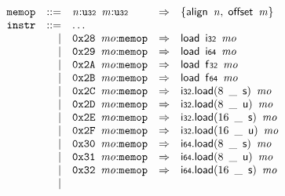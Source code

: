 $$
\begin{array}{@{}l@{}rrlll@{}l@{}}
& {\mathtt{memop}} &::=& {\mathit{n}}{:}{\mathtt{u{\scriptstyle32}}}~\,{\mathit{m}}{:}{\mathtt{u{\scriptstyle32}}} &\Rightarrow& \{ \begin{array}[t]{@{}l@{}}
\mathsf{align}~\,{\mathit{n}},\; \mathsf{offset}~\,{\mathit{m}} \}\end{array} \\
& {\mathtt{instr}} &::=& \dots \\ &&|&
\mathtt{0x28}~\,{\mathit{mo}}{:}{\mathtt{memop}} &\Rightarrow& \mathsf{load}~\,\mathsf{i{\scriptstyle32}}~\,{\mathit{mo}} \\ &&|&
\mathtt{0x29}~\,{\mathit{mo}}{:}{\mathtt{memop}} &\Rightarrow& \mathsf{load}~\,\mathsf{i{\scriptstyle64}}~\,{\mathit{mo}} \\ &&|&
\mathtt{0x2A}~\,{\mathit{mo}}{:}{\mathtt{memop}} &\Rightarrow& \mathsf{load}~\,\mathsf{f{\scriptstyle32}}~\,{\mathit{mo}} \\ &&|&
\mathtt{0x2B}~\,{\mathit{mo}}{:}{\mathtt{memop}} &\Rightarrow& \mathsf{load}~\,\mathsf{f{\scriptstyle64}}~\,{\mathit{mo}} \\ &&|&
\mathtt{0x2C}~\,{\mathit{mo}}{:}{\mathtt{memop}} &\Rightarrow& {\mathsf{i{\scriptstyle32}}.\mathsf{load}}{(8~\,\mathsf{\_}~\,\mathsf{s})}~\,{\mathit{mo}} \\ &&|&
\mathtt{0x2D}~\,{\mathit{mo}}{:}{\mathtt{memop}} &\Rightarrow& {\mathsf{i{\scriptstyle32}}.\mathsf{load}}{(8~\,\mathsf{\_}~\,\mathsf{u})}~\,{\mathit{mo}} \\ &&|&
\mathtt{0x2E}~\,{\mathit{mo}}{:}{\mathtt{memop}} &\Rightarrow& {\mathsf{i{\scriptstyle32}}.\mathsf{load}}{(16~\,\mathsf{\_}~\,\mathsf{s})}~\,{\mathit{mo}} \\ &&|&
\mathtt{0x2F}~\,{\mathit{mo}}{:}{\mathtt{memop}} &\Rightarrow& {\mathsf{i{\scriptstyle32}}.\mathsf{load}}{(16~\,\mathsf{\_}~\,\mathsf{u})}~\,{\mathit{mo}} \\ &&|&
\mathtt{0x30}~\,{\mathit{mo}}{:}{\mathtt{memop}} &\Rightarrow& {\mathsf{i{\scriptstyle64}}.\mathsf{load}}{(8~\,\mathsf{\_}~\,\mathsf{s})}~\,{\mathit{mo}} \\ &&|&
\mathtt{0x31}~\,{\mathit{mo}}{:}{\mathtt{memop}} &\Rightarrow& {\mathsf{i{\scriptstyle64}}.\mathsf{load}}{(8~\,\mathsf{\_}~\,\mathsf{u})}~\,{\mathit{mo}} \\ &&|&
\mathtt{0x32}~\,{\mathit{mo}}{:}{\mathtt{memop}} &\Rightarrow& {\mathsf{i{\scriptstyle64}}.\mathsf{load}}{(16~\,\mathsf{\_}~\,\mathsf{s})}~\,{\mathit{mo}} \\ &&|&

\end{array}$$

